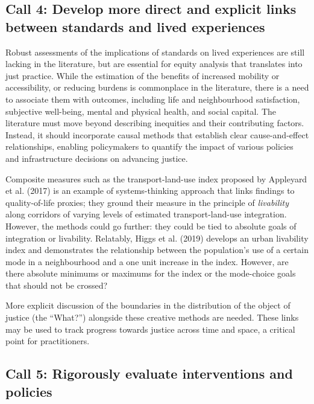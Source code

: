 \documentclass[
  letterpaper,
  DIV=11,
  numbers=noendperiod]{scrartcl}
\begin{document}
\subsection{Call 4: Develop more direct and explicit links between
standards and lived
experiences}\label{call-4-develop-more-direct-and-explicit-links-between-standards-and-lived-experiences}

Robust assessments of the implications of standards on lived experiences
are still lacking in the literature, but are essential for equity
analysis that translates into just practice. While the estimation of the
benefits of increased mobility or accessibility, or reducing burdens is
commonplace in the literature, there is a need to associate them with
outcomes, including life and neighbourhood satisfaction, subjective
well-being, mental and physical health, and social capital. The
literature must move beyond describing inequities and their contributing
factors. Instead, it should incorporate causal methods that establish
clear cause-and-effect relationships, enabling policymakers to quantify
the impact of various policies and infrastructure decisions on advancing
justice.

Composite measures such as the transport-land-use index proposed by
Appleyard et al. (2017) is an example of systems-thinking approach that
links findings to quality-of-life proxies; they ground their measure in
the principle of \emph{livability} along corridors of varying levels of
estimated transport-land-use integration. However, the methods could go
further: they could be tied to absolute goals of integration or
livability. Relatably, Higgs et al. (2019) develops an urban livability
index and demonstrates the relationship between the population's use of
a certain mode in a neighbourhood and a one unit increase in the index.
However, are there absolute minimums or maximums for the index or the
mode-choice goals that should not be crossed?

More explicit discussion of the boundaries in the distribution of the
object of justice (the ``What?'') alongside these creative methods are
needed. These links may be used to track progress towards justice across
time and space, a critical point for practitioners.

\subsection{Call 5: Rigorously evaluate interventions and
policies}\label{call-5-rigorously-evaluate-interventions-and-policies}
\end{document}
